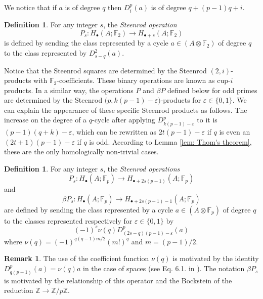 \documentclass[A4]{amsart}
\theoremstyle{definition}
\newtheorem{definition}[theorem]{Definition}
\newtheorem{remark}[theorem]{Remark}
\begin{document}
We notice that if $a$ is of degree $q$ then $D^p_i(a)$ is of degree $q + (p-1)q + i$.

\begin{definition}
	For any integer $s$, the \textit{Steenrod operation}
	\begin{equation*}
	P_s : H_\bullet(A; \mathbb{F}_2) \to H_{\bullet + s}(A; \mathbb{F}_2)
	\end{equation*}
	is defined by sending the class represented by a cycle $a \in (A \otimes \mathbb{F}_2)$ of degree $q$ to the class represented by $D^2_{s-q}(a)$.
\end{definition}

Notice that the Steenrod squares are determined by the Steenrod $(2,i)$-products with $\mathbb{F}_2$-coefficients. These binary operations are known as cup-$i$ products. In a similar way, the operations $P$ and $\beta P$ defined below for odd primes are determined by the Steenrod $\big(p, k(p-1)-\varepsilon\big)$-products for $\varepsilon \in \{0,1\}$. We can explain the appearance of these specific Steenrod products as follows. The increase on the degree of a $q$-cycle after applying $D^p_{k(p-1)-\varepsilon}$ to it is $(p-1)(q+k) - \varepsilon$, which can be rewritten as $2t(p-1) - \varepsilon$ if $q$ is even an $(2t+1)(p-1) - \varepsilon$ if $q$ is odd. According to Lemma \ref{lem: Thom's theorem}, these are the only homologically non-trivial cases.

\begin{definition} \label{def: Steenrod operations at odd prime}
	For any integer $s$, the \textit{Steenrod operations}
	\begin{equation*}
	P_s : H_\bullet(A; \mathbb{F}_p) \to H_{\bullet + 2s(p-1)}(A; \mathbb{F}_p)
	\end{equation*}
	and
	\begin{equation*}
	\beta P_s : H_\bullet(A; \mathbb{F}_p) \to H_{\bullet + 2s(p-1) - 1}(A; \mathbb{F}_p)
	\end{equation*}
	are defined by sending the class represented by a cycle $a \in (A \otimes \mathbb{F}_p)$ of degree $q$ to the classes represented respectively for $\varepsilon \in\{0,1\}$ by
	\begin{equation*}
	(-1)^s \nu(q) D^p_{(2s-q)(p-1)-\varepsilon}(a)
	\end{equation*}
	where $\nu(q) = (-1)^{q(q-1)m/2}(m!)^q$ and $m = (p-1)/2$.
\end{definition}

\begin{remark}
	The use of the coefficient function $\nu(q)$ is motivated by the identity $D_{q(p-1)}^p(a) = \nu(q)a$ in the case of spaces (see Eq. 6.1. in \cite{steenrod53cyclic}). The notation $\beta P_s$ is motivated by the relationship of this operator and the Bockstein of the reduction $\mathbb Z \to \mathbb Z/p\mathbb Z$.
\end{remark}
\end{document}
